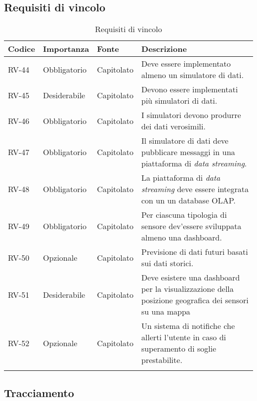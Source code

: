 \subsection{Requisiti di vincolo}
\begin{longtable}{|>{\centering\arraybackslash}m{}|>{\centering\arraybackslash}m{}|>{\centering\arraybackslash}m{}|>{\centering\arraybackslash}m{}|}
	\hline
	\textbf{Codice} & \textbf{Importanza} & \textbf{Fonte} & \textbf{Descrizione}
	\\\hline
	\endfirsthead
	\hline
	\endhead
	RV-44           & Obbligatorio        & Capitolato     & Deve essere implementato almeno un simulatore di dati.
	\\\hline
	RV-45           & Desiderabile        & Capitolato     & Devono essere implementati più simulatori di dati.
	\\\hline
	RV-46           & Obbligatorio        & Capitolato     & I simulatori devono produrre dei dati verosimili.                                                       \\\hline
	RV-47           & Obbligatorio        & Capitolato     & Il simulatore di dati deve pubblicare messaggi in una piattaforma di \textit{data streaming}.
	\\\hline
	RV-48           & Obbligatorio        & Capitolato     & La piattaforma di \textit{data streaming} deve essere integrata con un un database OLAP.
	\\\hline
	RV-49           & Obbligatorio        & Capitolato     & Per ciascuna tipologia di sensore dev'essere sviluppata almeno una dashboard.
	\\\hline
	RV-50           & Opzionale           & Capitolato     & Previsione di dati futuri basati sui dati storici.                                                      \\\hline
	RV-51           & Desiderabile        & Capitolato     & Deve esistere una dashboard per la visualizzazione della posizione geografica dei sensori su una mappa
	\\\hline
	RV-52           & Opzionale           & Capitolato     & Un sistema di notifiche che allerti l'utente in caso di superamento di soglie prestabilite.
	\\\hline
	\caption{Requisiti di vincolo}
	\label{table:3}
\end{longtable}

\subsection{Tracciamento}
